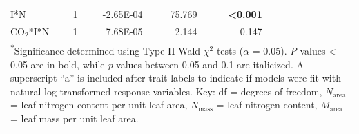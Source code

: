 \begin{landscape}
\begin{table}[]
{\begin{tabular}{p{3cm}p{0.5cm}p{1.75cm}p{1.5cm}p{1.5cm}p{1.75cm}p{1.5cm}p{1.5cm}p{1.75cm}p{1.5cm}p{1.5cm}}
            I*N & \multicolumn{1}{r}{1}
            & \multicolumn{1}{r}{-2.65E-04} & \multicolumn{1}{r}{ 75.769}   & \multicolumn{1}{r}{\textbf{<0.001}}
            & \multicolumn{1}{r}{}          & \multicolumn{1}{r}{}          & \multicolumn{1}{r}{}
            & \multicolumn{1}{r}{}          & \multicolumn{1}{r}{}          & \multicolumn{1}{r}{} 
            \\

            CO$_2$*I*N & \multicolumn{1}{r}{1}
            & \multicolumn{1}{r}{7.68E-05}  & \multicolumn{1}{r}{  2.144}   & \multicolumn{1}{r}{0.147}
            & \multicolumn{1}{r}{}          & \multicolumn{1}{r}{}          & \multicolumn{1}{r}{}
            & \multicolumn{1}{r}{}          & \multicolumn{1}{r}{}          & \multicolumn{1}{r}{} 
            \\
            \hline
            \multicolumn{11}{p{22.5cm}}{\textsuperscript{$*$}Significance determined using Type II Wald $\chi^{2}$ tests ($\alpha$ = 0.05). \textit{P}-values < 0.05 are in bold, while \textit{p}-values between 0.05 and 0.1 are italicized. A superscript “a” is included after trait labels to indicate if models were fit with natural log transformed response variables. Key: df = degrees of freedom, $N_\mathrm{area}$ = leaf nitrogen content per unit leaf area, $N_\mathrm{mass}$ = leaf nitrogen content, $M_\mathrm{area}$ = leaf mass per unit leaf area.}
    \end{tabular}}
    \label{tab:table5.1}
    \end{table}
\end{landscape}
\clearpage

